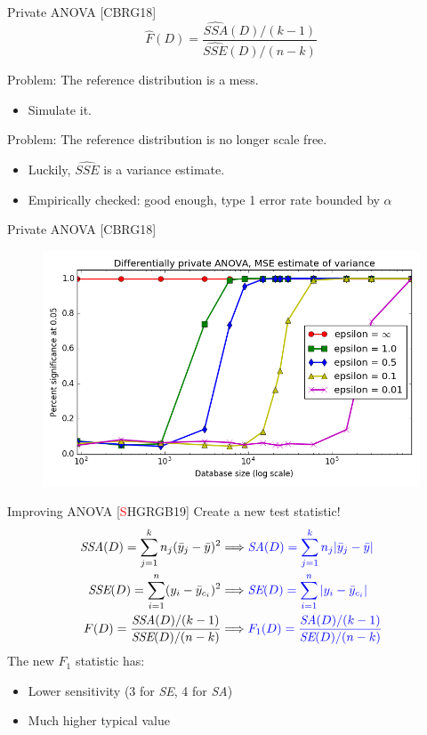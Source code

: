 \documentclass{beamer}
\newcommand{\sse}{\textit{SSE}\xspace}
\newcommand{\ssa}{\textit{SSA}\xspace}
\newcommand{\se}{\textit{SE}\xspace}
\newcommand{\sa}{\textit{SA}\xspace}
\begin{document}
\begin{frame}{Private ANOVA [CBRG18]}
$$\widehat{F}(D) = \frac{\widehat{\ssa}(D)/(k-1)}{\widehat{\sse}(D)/(n-k)}$$
\bigskip

 \pause
Problem: The reference distribution is a mess. \pause
\begin{itemize}
\item Simulate it.
\end{itemize}

 \pause
Problem: The reference distribution is no longer scale free.  \pause
\begin{itemize}
\item Luckily, $\widehat{\sse}$ is a variance estimate.  \pause
\item Empirically checked: good enough, type 1 error rate bounded by $\alpha$
\end{itemize}
\end{frame}

\begin{frame}{Private ANOVA [CBRG18]}
  \begin{figure}
  \includegraphics[scale=0.5]{images/campbellpower}
  \end{figure}
\end{frame}

\begin{frame}{Improving ANOVA [\textcolor{red}{S}HGRGB19]}
Create a new test statistic! \pause
\begin{align*}
\ssa(D) = \sum_{j=1}^{k} n_j (\bar{y}_j - \bar{y})^2  &\Longrightarrow \textcolor{blue}{ \sa(D) = \sum_{j=1}^{k} n_j |\bar{y}_j - \bar{y}| }\\  
\sse(D) = \sum_{i=1}^{n}  (y_{i}-\bar{y}_{c_i})^2  &\Longrightarrow \textcolor{blue}{\se(D) = \sum_{i=1}^{n}  |y_{i}-\bar{y}_{c_i}| } \\  
F(D) = \frac{\ssa(D)/(k-1)}{\sse(D)/(n-k)} &\Longrightarrow  \textcolor{blue} {F_1(D) = \frac{\sa(D)/(k-1)}{\se(D)/(n-k)}}
\end{align*}
 \pause
The new $F_1$ statistic has: \pause
\begin{itemize}
\item Lower sensitivity (3 for \se, 4 for \sa) \pause
\item Much higher typical value 
\end{itemize}
\end{frame}
\end{document}
